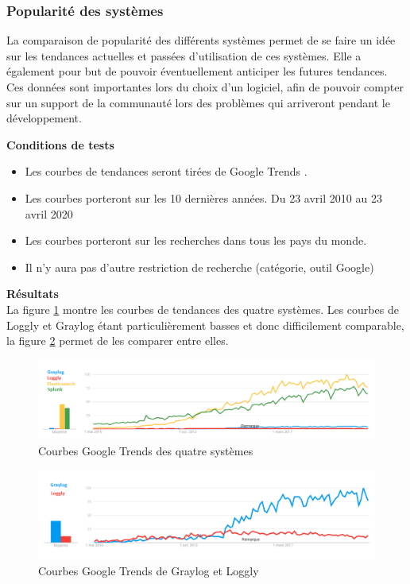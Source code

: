 \documentclass[paper=a4, fontsize=11pt]{scrartcl}
\begin{document}
\subsubsection{Popularité des systèmes}

La comparaison de popularité des différents systèmes permet de se faire un idée sur les tendances actuelles et passées d'utilisation de ces systèmes. Elle a également pour but de pouvoir éventuellement anticiper les futures tendances. Ces données sont importantes lors du choix d'un logiciel, afin de pouvoir compter sur un support de la communauté lors des problèmes qui arriveront pendant le développement.

\textbf{Conditions de tests} \\

\begin{itemize}
    \item Les courbes de tendances seront tirées de Google Trends \cite{noauthor_google_nodate}.
    \item Les courbes porteront sur les 10 dernières années.
    \subitem Du 23 avril 2010 au 23 avril 2020
    \item Les courbes porteront sur les recherches dans tous les pays du monde.
    \item Il n'y aura pas d'autre restriction de recherche (catégorie, outil Google)
\end{itemize}

\textbf{Résultats} \\
La figure \ref{f-Trends4Systemes} montre les courbes de tendances des quatre systèmes. Les courbes de Loggly et Graylog étant particulièrement basses et donc difficilement comparable, la figure \ref{f-Trends2Systemes} permet de les comparer entre elles.

\begin{figure}[H]
    \centering
    \includegraphics[width=18cm]{img/screenshots/Tendance_4.png}
    \caption{Courbes Google Trends des quatre systèmes}
    \label{f-Trends4Systemes}
\end{figure}

\begin{figure}[H]
    \centering
    \includegraphics[width=18cm]{img/screenshots/Tendance_2.png}
    \caption{Courbes Google Trends de Graylog et Loggly}
    \label{f-Trends2Systemes}
\end{figure}
\end{document}
